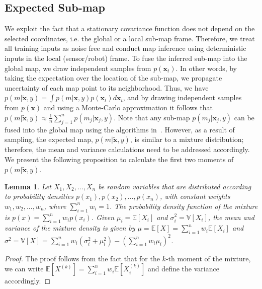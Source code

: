 \documentclass[letterpaper, 10 pt, journal, twoside]{IEEEtran}  %
\newtheorem{lemma}[theorem]{Lemma}
\begin{document}
\subsection{Expected Sub-map}
\label{sec:Post}
We exploit the fact that a stationary covariance function does not depend on the selected coordinates, i.e. the global or a local sub-map frame. Therefore, we treat all training inputs as noise free and conduct map inference using deterministic inputs in the local (sensor/robot) frame. To fuse the inferred sub-map into the global map, we draw independent samples from $p(\boldsymbol x_{t})$. In other words, by taking the expectation over the location of the sub-map, we propagate uncertainty of each map point to its neighborhood. Thus, we have \mbox{$p(m|\boldsymbol{\tilde{x}},y) = \int p(m|\boldsymbol x,y) p(\boldsymbol x_{t}) d\boldsymbol x_{t}$}, and by drawing independent samples from $p(\boldsymbol x)$ and using a Monte-Carlo approximation it follows that \mbox{$p(m|\boldsymbol{\tilde{x}},y) \approx \frac{1}{n}\sum_{j=1}^{n} p(m_j|\boldsymbol x_j,y)$}. Note that any sub-map $p(m_j|\boldsymbol x_j,y)$ can be fused into the global map using the algorithms in~\cite{jadidi2016gaussian}. However, as a result of sampling, the expected map, $p(m|\boldsymbol{\tilde{x}},y)$, is similar to a mixture distribution; therefore, the mean and variance calculations need to be addressed accordingly. We present the following proposition to calculate the first two moments of $p(m|\boldsymbol{\tilde{x}},y)$.
\begin{lemma}
\label{lem:meanvarmix}
Let $X_1,X_2,...,X_n$ be random variables that are distributed according to probability densities $p(x_1), p(x_2),...,p(x_n)$, with constant weights $w_1,w_2,...,w_n$, where $\sum_{i=1}^n w_i = 1$. The probability density function of the mixture is $p(x) = \sum_{i=1}^n  w_i p(x_i)$. Given $\mu_i = \mathbb{E}[X_i]$ and $\sigma_i^2 = \mathbb{V}[X_i]$, the mean and variance of the mixture density is given by $\mu = \mathbb{E}[X] = \sum_{i=1}^n  w_i \mathbb{E}[X_i]$ and $\sigma^2 = \mathbb{V}[X] = \sum_{i=1}^n  w_i (\sigma_i^2 + \mu_i^2) - (\sum_{i=1}^n  w_i \mu_i)^2$.
\end{lemma}
\begin{proof}
 The proof follows from the fact that for the $k$-th moment of the mixture, we can write \mbox{$\mathbb{E}[X^{(k)}] = \sum_{i=1}^n w_i \mathbb{E}[X_i^{(k)}]$} and define the variance accordingly.
\end{proof}
\end{document}
